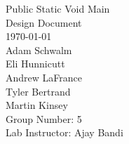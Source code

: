 \begin{titlepage}
\begin{center}

\vspace*{3.0 cm}
{\Huge Public Static Void Main}\\[0.7cm]
{\Large Design Document}\\[3.8cm]
{\Large \today}\\[0.5cm]
Adam Schwalm\\
Eli Hunnicutt\\
Andrew LaFrance\\
Tyler Bertrand\\
Martin Kinsey\\[4.0cm]

Group Number: 5\\
Lab Instructor: Ajay Bandi
  

  
\end{center}
\end{titlepage}
